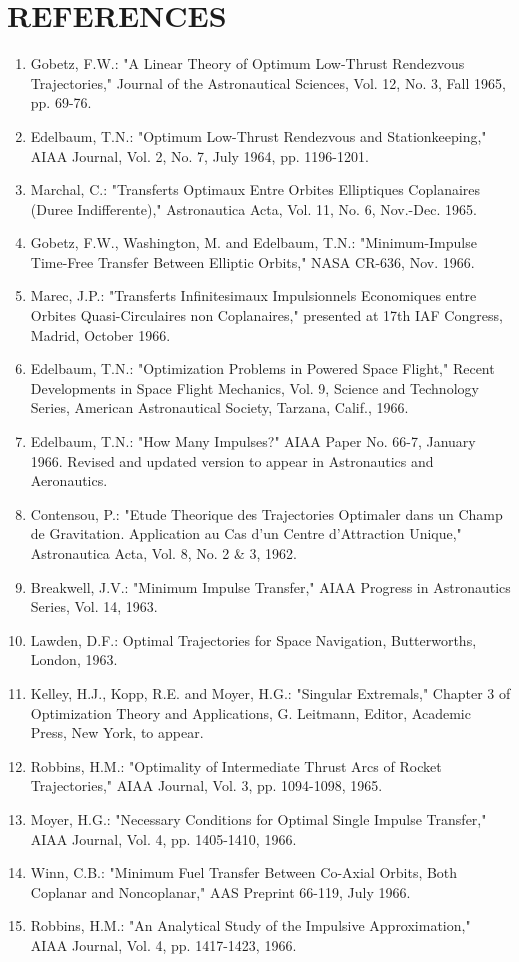 \documentclass[12pt]{article}
\begin{document}
\section*{REFERENCES}
\begin{enumerate}
\item Gobetz, F.W.: "A Linear Theory of Optimum Low-Thrust Rendezvous Trajectories," Journal of the Astronautical Sciences, Vol. 12, No. 3, Fall 1965, pp. 69-76.
\item Edelbaum, T.N.: "Optimum Low-Thrust Rendezvous and Stationkeeping," AIAA Journal, Vol. 2, No. 7, July 1964, pp. 1196-1201.
\item Marchal, C.: "Transferts Optimaux Entre Orbites Elliptiques Coplanaires (Duree Indifferente)," Astronautica Acta, Vol. 11, No. 6, Nov.-Dec. 1965.
\item Gobetz, F.W., Washington, M. and Edelbaum, T.N.: "Minimum-Impulse Time-Free Transfer Between Elliptic Orbits," NASA CR-636, Nov. 1966.
\item Marec, J.P.: "Transferts Infinitesimaux Impulsionnels Economiques entre Orbites Quasi-Circulaires non Coplanaires," presented at 17th IAF Congress, Madrid, October 1966.
\item Edelbaum, T.N.: "Optimization Problems in Powered Space Flight," Recent Developments in Space Flight Mechanics, Vol. 9, Science and Technology Series, American Astronautical Society, Tarzana, Calif., 1966.
\item Edelbaum, T.N.: "How Many Impulses?" AIAA Paper No. 66-7, January 1966. Revised and updated version to appear in Astronautics and Aeronautics.
\item Contensou, P.: "Etude Theorique des Trajectories Optimaler dans un Champ de Gravitation. Application au Cas d'un Centre d'Attraction Unique," Astronautica Acta, Vol. 8, No. 2 \& 3, 1962.
\item Breakwell, J.V.: "Minimum Impulse Transfer," AIAA Progress in Astronautics Series, Vol. 14, 1963.
\item Lawden, D.F.: Optimal Trajectories for Space Navigation, Butterworths, London, 1963.
\item Kelley, H.J., Kopp, R.E. and Moyer, H.G.: "Singular Extremals," Chapter 3 of Optimization Theory and Applications, G. Leitmann, Editor, Academic Press, New York, to appear.
\item Robbins, H.M.: "Optimality of Intermediate Thrust Arcs of Rocket Trajectories," AIAA Journal, Vol. 3, pp. 1094-1098, 1965.
\item Moyer, H.G.: "Necessary Conditions for Optimal Single Impulse Transfer," AIAA Journal, Vol. 4, pp. 1405-1410, 1966.
\item Winn, C.B.: "Minimum Fuel Transfer Between Co-Axial Orbits, Both Coplanar and Noncoplanar," AAS Preprint 66-119, July 1966.
\item Robbins, H.M.: "An Analytical Study of the Impulsive Approximation," AIAA Journal, Vol. 4, pp. 1417-1423, 1966.
\end{enumerate}
\end{document}
